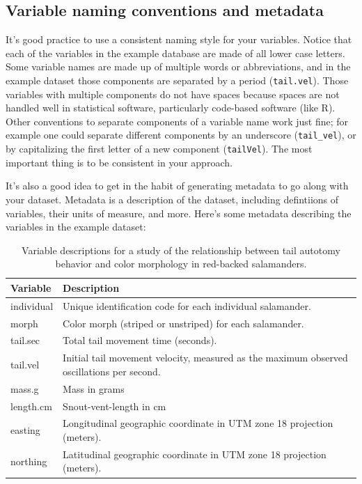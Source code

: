 \documentclass[
]{book}
\begin{document}
\subsection{Variable naming conventions and metadata}\label{variable-naming-conventions-and-metadata}

It's good practice to use a consistent naming style for your variables. Notice that each of the variables in the example database are made of all lower case letters. Some variable names are made up of multiple words or abbreviations, and in the example dataset those components are separated by a period (\texttt{tail.vel}). Those variables with multiple components do not have spaces because spaces are not handled well in statistical software, particularly code-based software (like R). Other conventions to separate components of a variable name work just fine; for example one could separate different components by an underscore (\texttt{tail\_vel}), or by capitalizing the first letter of a new component (\texttt{tailVel}). The most important thing is to be consistent in your approach.

It's also a good idea to get in the habit of generating metadata to go along with your dataset. Metadata is a description of the dataset, including defintiions of variables, their units of measure, and more. Here's some metadata describing the variables in the example dataset:

\begin{table}
\centering
\caption{\label{tab:c3t2}Variable descriptions for a study of the relationship between tail autotomy behavior and color morphology in red-backed salamanders.}
\centering
\begin{tabular}[t]{l|l}
\hline
Variable & Description\\
\hline
individual & Unique identification code for each individual salamander.\\
\hline
morph & Color morph (striped or unstriped) for each salamander.\\
\hline
tail.sec & Total tail movement time (seconds).\\
\hline
tail.vel & Initial tail movement velocity, measured as the maximum observed oscillations per second.\\
\hline
mass.g & Mass in grams\\
\hline
length.cm & Snout-vent-length in cm\\
\hline
easting & Longitudinal geographic coordinate in UTM zone 18 projection (meters).\\
\hline
northing & Latitudinal geographic coordinate in UTM zone 18 projection (meters).\\
\hline
\end{tabular}
\end{table}
\end{document}
